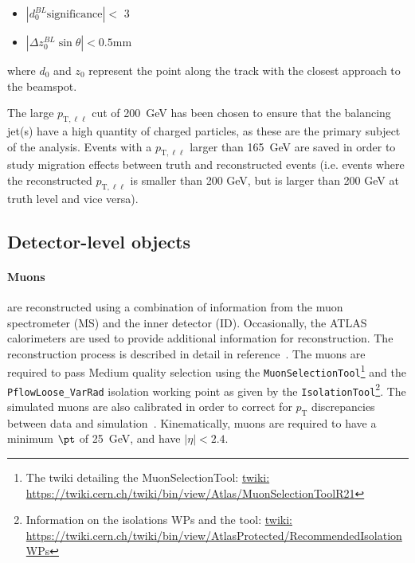 \begin{itemize}
    \item $|d_0^{BL}\text{significance}| < $ 3
    \item $|\Delta z_0^{BL}\sin\theta| < 0.5 $mm
\end{itemize}

where $d_0$ and $z_0$ represent the point along the track with the closest approach to the beamspot.

The large $p_{\text{T},\ell\ell}$ cut of 200~GeV has been chosen to ensure that the balancing jet(s) have a high quantity of charged particles, as these are the primary subject of the analysis.
Events with a $p_{\text{T},\ell\ell}$ larger than 165~GeV are saved in order to study migration effects between truth and reconstructed events (i.e. events where the reconstructed $p_{\text{T},\ell\ell}$
is smaller than 200 GeV, but is larger than 200 GeV at truth level and vice versa).

\subsection{Detector-level objects}

\paragraph{Muons} are reconstructed using a combination of information from the muon spectrometer (MS) and the inner detector (ID). Occasionally, the ATLAS calorimeters are used to provide additional information for reconstruction. The reconstruction process is described in detail in reference~\cite{Aad:2016jkr}.
The muons are required to pass Medium quality selection using the \texttt{MuonSelectionTool}\footnote{The twiki detailing the MuonSelectionTool: \url{twiki: https://twiki.cern.ch/twiki/bin/view/Atlas/MuonSelectionToolR21}} and the \texttt{PflowLoose\_VarRad} isolation working point as given by
the \texttt{IsolationTool}\footnote{Information on the isolations WPs and the tool: \url{twiki: https://twiki.cern.ch/twiki/bin/view/AtlasProtected/RecommendedIsolationWPs}}. The simulated muons are also calibrated in order to correct for $p_\text{T}$ discrepancies between data and simulation~\cite{Aad:2016jkr}.
Kinematically, muons are required to have a minimum $\pt$ of 25~GeV, and have $|\eta|<2.4$.


